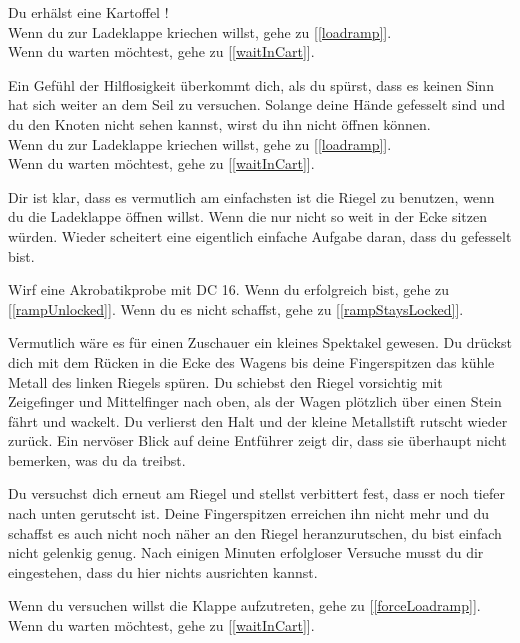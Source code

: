 Du erhälst eine Kartoffel !
\\Wenn du zur Ladeklappe kriechen willst, gehe zu [\ref{loadramp}].
\\Wenn du warten möchtest, gehe zu [\ref{waitInCart}].


Ein Gefühl der Hilflosigkeit überkommt dich, als du spürst, dass es keinen Sinn hat sich weiter an dem Seil zu versuchen. Solange deine Hände gefesselt sind und du den Knoten nicht sehen kannst, wirst du ihn nicht öffnen können.
\\Wenn du zur Ladeklappe kriechen willst, gehe zu [\ref{loadramp}].
\\Wenn du warten möchtest, gehe zu [\ref{waitInCart}].


Dir ist klar, dass es vermutlich am einfachsten ist die Riegel zu benutzen, wenn du die Ladeklappe öffnen willst. Wenn die nur nicht so weit in der Ecke sitzen würden. Wieder scheitert eine eigentlich einfache Aufgabe daran, dass du gefesselt bist.

Wirf eine Akrobatikprobe mit DC 16. Wenn du erfolgreich bist, gehe zu [\ref{rampUnlocked}].
Wenn du es nicht schaffst, gehe zu [\ref{rampStaysLocked}].


Vermutlich wäre es für einen Zuschauer ein kleines Spektakel gewesen. Du drückst dich mit dem Rücken in die Ecke des Wagens bis deine Fingerspitzen das kühle Metall des linken Riegels spüren. Du schiebst den Riegel vorsichtig mit Zeigefinger und Mittelfinger nach oben, als der Wagen plötzlich über einen Stein fährt und wackelt. Du verlierst den Halt und der kleine Metallstift rutscht wieder zurück. Ein nervöser Blick auf deine Entführer zeigt dir, dass sie überhaupt nicht bemerken, was du da treibst.

Du versuchst dich erneut am Riegel und stellst verbittert fest, dass er noch tiefer nach unten gerutscht ist. Deine Fingerspitzen erreichen ihn nicht mehr und du schaffst es auch nicht noch näher an den Riegel heranzurutschen, du bist einfach nicht gelenkig genug. Nach einigen Minuten erfolgloser Versuche musst du dir eingestehen, dass du hier nichts ausrichten kannst.

Wenn du versuchen willst die Klappe aufzutreten, gehe zu [\ref{forceLoadramp}].
Wenn du warten möchtest, gehe zu [\ref{waitInCart}].

